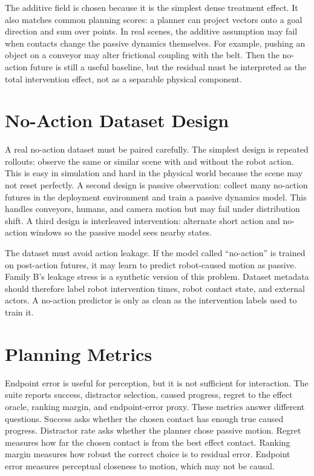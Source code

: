 \documentclass{article}
\begin{document}
The additive field is chosen because it is the simplest dense treatment effect.  It also
matches common planning scores: a planner can project vectors onto a goal direction and
sum over points.  In real scenes, the additive assumption may fail when contacts change
the passive dynamics themselves.  For example, pushing an object on a conveyor may alter
frictional coupling with the belt.  Then the no-action future is still a useful baseline,
but the residual must be interpreted as the total intervention effect, not as a
separable physical component.

\section{No-Action Dataset Design}

A real no-action dataset must be paired carefully.  The simplest design is repeated
rollouts: observe the same or similar scene with and without the robot action.  This is
easy in simulation and hard in the physical world because the scene may not reset
perfectly.  A second design is passive observation: collect many no-action futures in the
deployment environment and train a passive dynamics model.  This handles conveyors,
humans, and camera motion but may fail under distribution shift.  A third design is
interleaved intervention: alternate short action and no-action windows so the passive
model sees nearby states.

The dataset must avoid action leakage.  If the model called ``no-action'' is trained on
post-action futures, it may learn to predict robot-caused motion as passive.  Family B's
leakage stress is a synthetic version of this problem.  Dataset metadata should
therefore label robot intervention times, robot contact state, and external actors.  A
no-action predictor is only as clean as the intervention labels used to train it.

\section{Planning Metrics}

Endpoint error is useful for perception, but it is not sufficient for interaction.  The
suite reports success, distractor selection, caused progress, regret to the effect
oracle, ranking margin, and endpoint-error proxy.  These metrics answer different
questions.  Success asks whether the chosen contact has enough true caused progress.
Distractor rate asks whether the planner chose passive motion.  Regret measures how far
the chosen contact is from the best effect contact.  Ranking margin measures how robust
the correct choice is to residual error.  Endpoint error measures perceptual closeness to
motion, which may not be causal.
\end{document}
